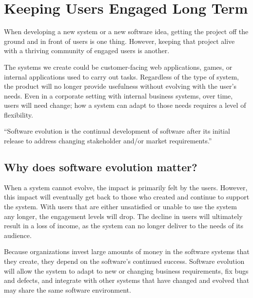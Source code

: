 
\section{Keeping Users Engaged Long Term} \label{sectionTheProblem}


When developing a new system or a new software idea, getting the project off the ground and in front of users is one thing. However, keeping that project alive with a thriving community of engaged users is another.

The systems we create could be customer-facing web applications, games, or internal applications used to carry out tasks. Regardless of the type of system, the product will no longer provide usefulness without evolving with the user's needs. Even in a corporate setting with internal business systems, over time, users will need change; how a system can adapt to those needs requires a level of flexibility.

\vspace{0.25cm}
\begin{displayquote}
``Software evolution is the continual development of software after its initial release to address changing stakeholder and/or market requirements.'' \cite{wiki:software-evolution}
\end{displayquote}
\vspace{0.25cm}

\subsection{Why does software evolution matter?} \label{subWhySoftwareEvolution}

When a system cannot evolve, the impact is primarily felt by the users. However, this impact will eventually get back to those who created and continue to support the system. With users that are either unsatisfied or unable to use the system any longer, the engagement levels will drop. The decline in users will ultimately result in a loss of income, as the system can no longer deliver to the needs of its audience.

Because organizations invest large amounts of money in the software systems that they create, they depend on the software's continued success. Software evolution will allow the system to adapt to new or changing business requirements, fix bugs and defects, and integrate with other systems that have changed and evolved that may share the same software environment.

